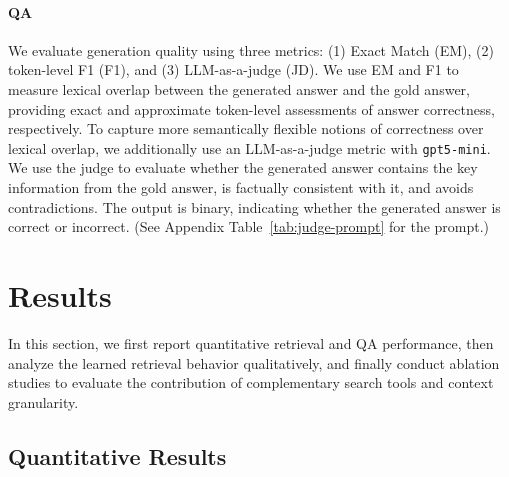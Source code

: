 \documentclass[11pt]{article}
\newcommand{\ml}[1]{\textcolor{orange}{\bf [lan: #1]}}
\begin{document}
\paragraph{QA} We evaluate generation quality using three metrics: (1) Exact Match (EM), (2) token-level F1 (F1), and (3) LLM-as-a-judge (JD). We use EM and F1 to measure lexical overlap between the generated answer and the gold answer, providing exact and approximate token-level assessments of answer correctness, respectively. To capture more semantically flexible notions of correctness over lexical overlap, we additionally use an LLM-as-a-judge metric with \texttt{gpt5-mini}. We use the judge to evaluate whether the generated answer contains the key information from the gold answer, is factually consistent with it, and avoids contradictions. The output is binary, indicating whether the generated answer is correct or incorrect. (See Appendix Table~\ref{tab:judge-prompt} for the prompt.)


\section{Results}
In this section, we first report quantitative retrieval and QA performance, then analyze the learned retrieval behavior qualitatively, and finally conduct ablation studies to evaluate the contribution of complementary search tools and context granularity.

\subsection{Quantitative Results}
\end{document}
